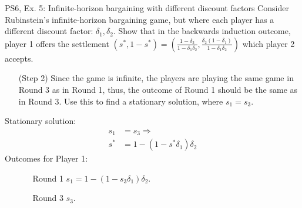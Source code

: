 \begin{frame}{PS6, Ex. 5: Infinite-horizon bargaining with different discount factors}
    Consider Rubinstein's infinite-horizon bargaining game, but where each player has a different discount factor: $\delta_1,\delta_2$. Show that in the backwards induction outcome, player 1 offers the settlement
    $(s^{*},1-s^{*})=\left( \frac{1-\delta_2}{1-\delta_1\delta_2},\frac{\delta_2(1-\delta_1)}{1-\delta_1\delta_2}\right)$
    which player 2 accepts.
    \begin{itemize}
      \item[(Step 2)] Since the game is infinite, the players are playing the same game in Round 3 as in Round 1, thus, the outcome of Round 1 should be the same as in Round 3. Use this to find a stationary solution, where $s_{1}=s_{3}$.
    \end{itemize}
    \vfill\null
  \begin{multicols}{2}
    Stationary solution:
    \begin{align*}
          s_1&= s_3 \Rightarrow\\
        s^{*}&= 1- (1-s^{*}\delta_1)\delta_2
    \end{align*}
    \vfill\null \columnbreak
    Outcomes for Player 1:
    \begin{itemize}
        \item[]\vspace{-8pt}
            \begin{itemize}\normalsize
            \item[Round 1] $s_1 = 1-(1-s_3\delta_1)\delta_2$.
            \item[Round 3] $s_3$.
            \end{itemize}
    \end{itemize}
    \vfill\null
  \end{multicols}
    \vfill\null
\end{frame}
